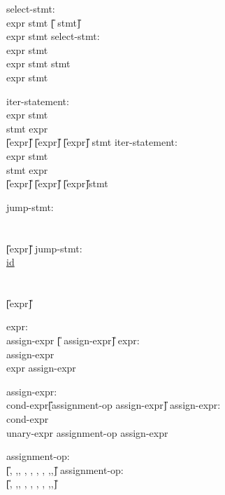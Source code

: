 \begin{center}
\PAIR 
{
select-stmt:\\
\>	 \T{(} expr \T{)} stmt \U{[} stmt\U{]}\\
\>	 \T{(} expr \T{)} stmt
}
{
select-stmt:\\
\>	 \T{(} expr \T{)} stmt\\
\>	 \T{(} expr \T{)} stmt  stmt\\
\>	 \T{(} expr \T{)} stmt
}

\PAIR
{
iter-statement:\\
\>       \T{(} expr \T{)} stmt\\
\>        stmt  \T{(} expr \T{)} \T{;}\\
\>        \T{(} \U{[}expr\U{]} \T{;} \U{[}expr\U{]} \T{;} \U{[}expr\U{]}\T{;}\T{)} stmt
}
{
iter-statement:\\
\>       \T{(} expr \T{)} stmt\\
\>        stmt  \T{(} expr \T{)} \T{;}\\
\>        \T{(} \U{[}expr\U{]} \T{;} \U{[}expr\U{]} \T{;} \U{[}expr\U{]}\T{;}\T{)}stmt
}

\PAIR
{
jump-stmt:\\
\>	 \T{;}\\
\>       \T{;}\\
\>	 \U{[}expr\U{]} \T{;}
}
{
jump-stmt:\\
\>	\underline{ id \T{;}}\\
\>	 \T{;}\\
\>	 \T{;}\\
\>	 \U{[}expr\U{]} \T{;}
}

\PAIR
{
expr:\\
\>	assign-expr \U{[}\T{,} assign-expr\U{]}
}
{
expr:\\
\>	assign-expr\\
\>	expr \T{,} assign-expr
}

\PAIR
{
assign-expr:\\
\>	cond-expr\U{[}assignment-op assign-expr\U{]}
}
{
assign-expr:\\
\>	cond-expr\\
\>	unary-expr assignment-op assign-expr
}



\PAIR
{
assignment-op: \\
\>     	\U{[}\T{*}, \T{/},\T{\%}, \T{+}, \T{-}, \T{\rightshift}, \T{\leftshift}, \T{\&},\T{\circumflex},\T{|}\U{]}  \T{=}
}
{
assignment-op: \\
\>     	\U{[}\T{*}, \T{/},\T{\%}, \T{+}, \T{-}, \T{\rightshift}, \T{\leftshift}, \T{\&},\T{\circumflex},\T{|}\U{]}  \T{=}
}


\end{center}
